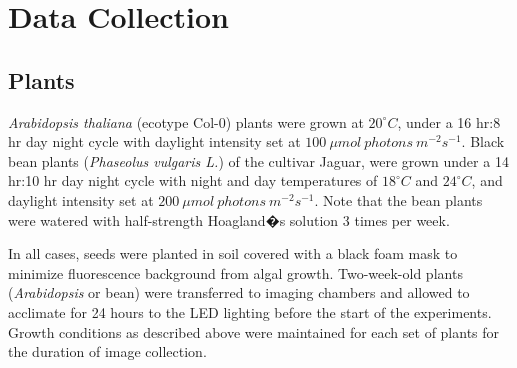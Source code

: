 \section{Data Collection}\label{sec:2}

\subsection{Plants}

{\it Arabidopsis thaliana} (ecotype Col-0) plants were grown at $20^{\circ}C$, under a 16 hr:8 hr day night cycle with daylight intensity set at $100~\mu mol~photons~m^{-2} s^{-1}$.
%
Black bean plants ({\it Phaseolus vulgaris L.}) of the cultivar Jaguar, were grown under a 14 hr:10 hr day night cycle with night and day temperatures of  $18^{\circ}C$ and $24^{\circ}C$, and daylight intensity set at $200~\mu mol~photons~m^{-2} s^{-1}$.
%
Note that the bean plants were watered with half-strength Hoagland�s solution 3 times per week. 

In all cases, seeds were planted in soil covered with a black foam mask to minimize fluorescence background from algal growth.
%
Two-week-old plants ({\it Arabidopsis} or bean) were transferred to imaging chambers and allowed to acclimate for 24 hours to the LED lighting before the start of the experiments. Growth conditions as described above were maintained for each set of plants for the duration of image collection.
